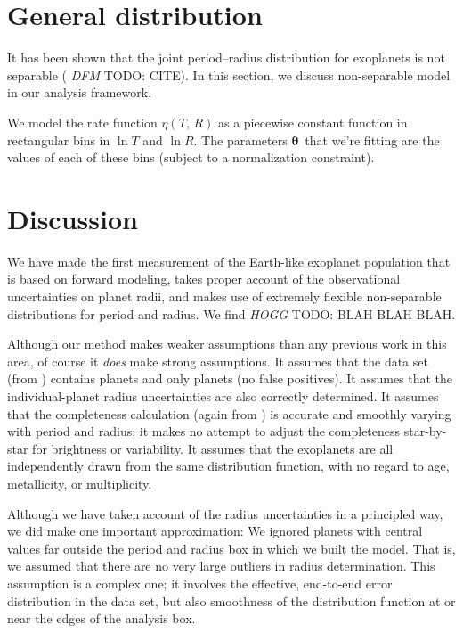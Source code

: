 \documentclass[12pt,preprint]{aastex}
\newcommand{\bvec}[1]{\ensuremath{\boldsymbol{#1}}}
\newcommand{\todo}[3]{{\color{#2} \emph{#1} TODO: #3}}
\newcommand{\dfmtodo}[1]{\todo{DFM}{red}{#1}}
\newcommand{\hoggtodo}[1]{\todo{HOGG}{blue}{#1}}
\newcommand{\rate}{\ensuremath{\eta}}
\newcommand{\ratepars}{{\ensuremath{\bvec{\theta}}}}
\newcommand{\radius}{\ensuremath{R}}
\newcommand{\period}{\ensuremath{T}}
\begin{document}
\section{General distribution}

It has been shown that the joint period--radius distribution for exoplanets is
not separable (\dfmtodo{CITE}).
In this section, we discuss non-separable model in our analysis framework.

We model the rate function $\rate(\period,\,\radius)$ as a piecewise constant
function in rectangular bins in $\ln\period$ and $\ln\radius$.
The parameters \ratepars\ that we're fitting are the values of each of these
bins (subject to a normalization constraint).

\section{Discussion}

We have made the first measurement of the Earth-like exoplanet population that
is based on forward modeling, takes proper account of the observational
uncertainties on planet radii, and makes use of extremely flexible
non-separable distributions for period and radius.
We find \hoggtodo{BLAH BLAH BLAH.}

Although our method makes weaker assumptions than any previous work in this
area, of course it \emph{does} make strong assumptions.
It assumes that the data set (from \citealt{petigura}) contains planets and
only planets (no false positives).
It assumes that the individual-planet radius uncertainties are also correctly
determined.
It assumes that the completeness calculation (again from \citealt{petigura})
is accurate and smoothly varying with period and radius; it makes no attempt
to adjust the completeness star-by-star for brightness or variability.
It assumes that the exoplanets are all independently drawn from the same
distribution function, with no regard to age, metallicity, or multiplicity.

Although we have taken account of the radius uncertainties in a principled
way, we did make one important approximation: We ignored planets with central
values far outside the period and radius box in which we built the model.
That is, we assumed that there are no very large outliers in radius
determination.
This assumption is a complex one; it involves the effective, end-to-end error
distribution in the data set, but also smoothness of the distribution function
at or near the edges of the analysis box.
\end{document}
